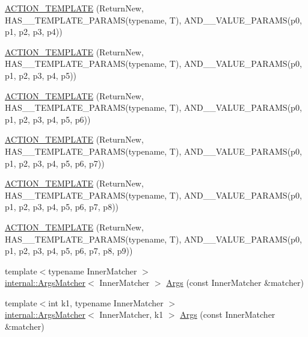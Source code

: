 \begin{DoxyCompactItemize}
\hyperlink{namespacetesting_a0c03444379adfb849db243829946c1ed}{A\+C\+T\+I\+O\+N\+\_\+\+T\+E\+M\+P\+L\+A\+TE} (Return\+New, H\+A\+S\+\_\+\_\+\+T\+E\+M\+P\+L\+A\+T\+E\+\_\+\+P\+A\+R\+A\+MS(typename, T), A\+N\+D\+\_\+\_\+\+V\+A\+L\+U\+E\+\_\+\+P\+A\+R\+A\+MS(p0, p1, p2, p3, p4))
\item 
\hyperlink{namespacetesting_a2ef1b31693ee2be0bb93602b375fb9ce}{A\+C\+T\+I\+O\+N\+\_\+\+T\+E\+M\+P\+L\+A\+TE} (Return\+New, H\+A\+S\+\_\+\_\+\+T\+E\+M\+P\+L\+A\+T\+E\+\_\+\+P\+A\+R\+A\+MS(typename, T), A\+N\+D\+\_\+\_\+\+V\+A\+L\+U\+E\+\_\+\+P\+A\+R\+A\+MS(p0, p1, p2, p3, p4, p5))
\item 
\hyperlink{namespacetesting_a7b4cfa09367e9938561eeca5a105d183}{A\+C\+T\+I\+O\+N\+\_\+\+T\+E\+M\+P\+L\+A\+TE} (Return\+New, H\+A\+S\+\_\+\_\+\+T\+E\+M\+P\+L\+A\+T\+E\+\_\+\+P\+A\+R\+A\+MS(typename, T), A\+N\+D\+\_\+\_\+\+V\+A\+L\+U\+E\+\_\+\+P\+A\+R\+A\+MS(p0, p1, p2, p3, p4, p5, p6))
\item 
\hyperlink{namespacetesting_a76d58331453ee0a2eb75a5992e35197b}{A\+C\+T\+I\+O\+N\+\_\+\+T\+E\+M\+P\+L\+A\+TE} (Return\+New, H\+A\+S\+\_\+\_\+\+T\+E\+M\+P\+L\+A\+T\+E\+\_\+\+P\+A\+R\+A\+MS(typename, T), A\+N\+D\+\_\+\_\+\+V\+A\+L\+U\+E\+\_\+\+P\+A\+R\+A\+MS(p0, p1, p2, p3, p4, p5, p6, p7))
\item 
\hyperlink{namespacetesting_adfb5791a941ec1f2a2f8067fd9ac7667}{A\+C\+T\+I\+O\+N\+\_\+\+T\+E\+M\+P\+L\+A\+TE} (Return\+New, H\+A\+S\+\_\+\_\+\+T\+E\+M\+P\+L\+A\+T\+E\+\_\+\+P\+A\+R\+A\+MS(typename, T), A\+N\+D\+\_\+\_\+\+V\+A\+L\+U\+E\+\_\+\+P\+A\+R\+A\+MS(p0, p1, p2, p3, p4, p5, p6, p7, p8))
\item 
\hyperlink{namespacetesting_a3934a47f6125504c939a3573b7fc55c4}{A\+C\+T\+I\+O\+N\+\_\+\+T\+E\+M\+P\+L\+A\+TE} (Return\+New, H\+A\+S\+\_\+\_\+\+T\+E\+M\+P\+L\+A\+T\+E\+\_\+\+P\+A\+R\+A\+MS(typename, T), A\+N\+D\+\_\+\_\+\+V\+A\+L\+U\+E\+\_\+\+P\+A\+R\+A\+MS(p0, p1, p2, p3, p4, p5, p6, p7, p8, p9))
\item 
{\footnotesize template$<$typename Inner\+Matcher $>$ }\\\hyperlink{classtesting_1_1internal_1_1ArgsMatcher}{internal\+::\+Args\+Matcher}$<$ Inner\+Matcher $>$ \hyperlink{namespacetesting_aaca153f67b689b8b9d5b8c67ecf8cee4}{Args} (const Inner\+Matcher \&matcher)
\item 
{\footnotesize template$<$int k1, typename Inner\+Matcher $>$ }\\\hyperlink{classtesting_1_1internal_1_1ArgsMatcher}{internal\+::\+Args\+Matcher}$<$ Inner\+Matcher, k1 $>$ \hyperlink{namespacetesting_af67bac6da407df7586f60cfa2c9b602d}{Args} (const Inner\+Matcher \&matcher)

\end{DoxyCompactItemize}
